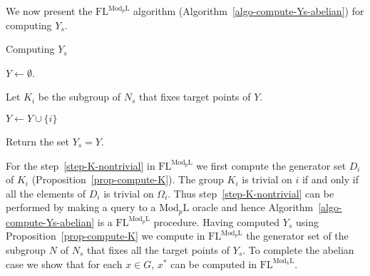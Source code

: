 \documentclass[11pt]{madras}%
\theoremstyle{remark}
\newcommand{\ModkL}[1]{{\ensuremath{\mathrm{Mod}_{#1}\mathrm{L}}}}
\begin{document}
We now present the $\mathrm{FL}^{\ModkL{p}}$ algorithm
(Algorithm~\ref{algo-compute-Ys-abelian}) for computing $Y_s$.

\begin{algorithm}
  \caption{Computing $Y_s$}\label{algo-compute-Ys-abelian}
  $Y \leftarrow \emptyset$.
  
  {

    Let $K_i$ be the subgroup of $N_s$ that fixes target points of
    $Y$.

    {  $Y \leftarrow Y \cup \{ i \}$  }%
  }
  Return the set $Y_s = Y$.
\end{algorithm}

For the step~\ref{step-K-nontrivial} in $\mathrm{FL}^{\ModkL{p}}$ we
first compute the generator set $D_i$ of $K_i$
(Proposition~\ref{prop-compute-K}). The group $K_i$ is trivial on $i$
if and only if all the elements of $D_i$ is trivial on $\Omega_i$.
Thus step~\ref{step-K-nontrivial} can be performed by making a query
to a $\ModkL{p}$ oracle and hence
Algorithm~\ref{algo-compute-Ys-abelian} is a $\mathrm{FL}^{\ModkL{p}}$
procedure. Having computed $Y_s$ using
Proposition~\ref{prop-compute-K} we compute in
$\mathrm{FL}^{\ModkL{p}}$ the generator set of the subgroup $N$ of
$N_s$ that fixes all the target points of $Y_s$.  To complete the
abelian case we show that for each $x \in G$, $x^*$ can be computed in
$\mathrm{FL}^{\ModkL{k}}$.
\end{document}
